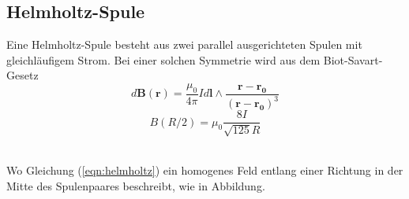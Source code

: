 \documentclass[a4paper,10pt]{scrartcl} %
\begin{document}
\subsection{Helmholtz-Spule}
\label{subsec:helmholtz}
\begin{minipage}[t]{0.5\textwidth}
	Eine Helmholtz-Spule besteht aus zwei parallel ausgerichteten Spulen mit gleichläufigem Strom. Bei einer solchen Symmetrie wird aus dem Biot-Savart-Gesetz
	\begin{equation}
	\label{eqn:biot-savart}
	d\mathbf{B(r)} = \frac{\mu _0}{4 \pi} I d\mathbf{l} \wedge \frac{\mathbf{r - r_0}}{(\mathbf{r - r_0})^3}
	\end{equation}
	\begin{equation}
	\label{eqn:helmholtz}
	B(R/2) = \mu _0 \frac{8 I}{\sqrt{125} R}
	\end{equation}
\end{minipage}
\hfill
\begin{minipage}[t]{0.55\textwidth}
\label{fig:helmholtz}
\end{minipage}
\\
Wo Gleichung (\ref{eqn:helmholtz}) ein homogenes Feld entlang einer Richtung in der Mitte des Spulenpaares beschreibt, wie in Abbildung.
\end{document}

